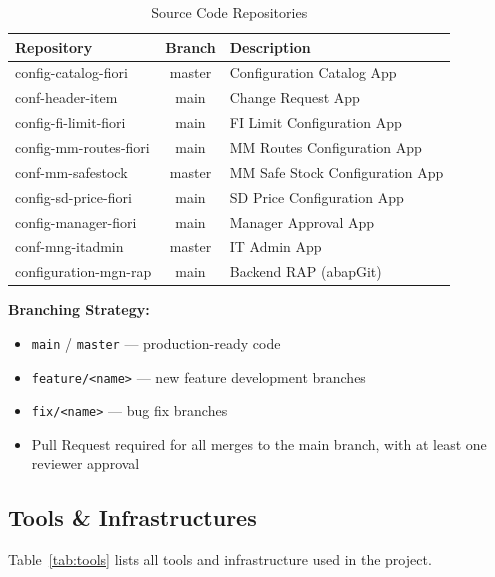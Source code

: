 \documentclass[12pt,a4paper]{report}
\begin{document}
\begin{table}[H]
\centering\small
\begin{tabularx}{\textwidth}{|l|c|X|}
  \hline
  \rowcolor{tableheadpeach}
  \textbf{Repository} & \textbf{Branch} & \textbf{Description} \\ \hline
  config-catalog-fiori    & master & Configuration Catalog App \\ \hline
  conf-header-item        & main   & Change Request App \\ \hline
  config-fi-limit-fiori   & main   & FI Limit Configuration App \\ \hline
  config-mm-routes-fiori  & main   & MM Routes Configuration App \\ \hline
  conf-mm-safestock       & master & MM Safe Stock Configuration App \\ \hline
  config-sd-price-fiori   & main   & SD Price Configuration App \\ \hline
  config-manager-fiori    & main   & Manager Approval App \\ \hline
  conf-mng-itadmin        & master & IT Admin App \\ \hline
  configuration-mgn-rap   & main   & Backend RAP (abapGit) \\ \hline
\end{tabularx}
\caption{Source Code Repositories}
\label{tab:repos}
\end{table}

\textbf{Branching Strategy:}
\begin{itemize}[leftmargin=2em]
  \item \texttt{main} / \texttt{master} --- production-ready code
  \item \texttt{feature/<name>} --- new feature development branches
  \item \texttt{fix/<name>} --- bug fix branches
  \item Pull Request required for all merges to the main branch, with at least one reviewer approval
\end{itemize}

\subsection{Tools \& Infrastructures}

Table~\ref{tab:tools} lists all tools and infrastructure used in the project.
\end{document}
